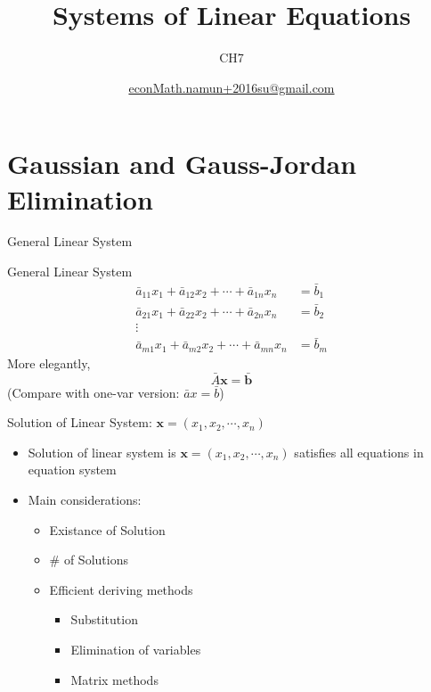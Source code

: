 \documentclass[final]{beamer}
\author[조남운]{\url{econMath.namun+2016su@gmail.com}}
\title{Systems of Linear Equations}
\subtitle{CH7}
\begin{document}
	
\maketitle


\section{Gaussian and Gauss-Jordan Elimination} %
\label{sec:gaussian_and_gauss_jordan_elimination}
\begin{frame}[t]{General Linear System}
	\begin{block}
		{General Linear System}
		\begin{align*}
			\bar a_{11} x_1 + \bar a_{12}x_2 + \cdots + \bar a_{1n}x_n &= \bar b_1\\
			\bar a_{21} x_1 + \bar a_{22}x_2 + \cdots + \bar a_{2n}x_n &= \bar b_2\\
			\vdots\\
			\bar a_{m1} x_1 + \bar a_{m2}x_2 + \cdots + \bar a_{mn}x_n &= \bar b_m
		\end{align*}
		More elegantly, 
		\[
			\bar{A}\mathbf{x} = \bar{\mathbf{b}}
		\]
		(Compare with one-var version: $\bar a x = \bar b$)
	\end{block}
\end{frame}
\begin{frame}[t]{Solution of Linear System: $\mathbf{x}=(x_1,x_2,\cdots,x_n)$}
	\begin{itemize}
		\item Solution of linear system is $\mathbf{x}=(x_1,x_2,\cdots,x_n)$ satisfies all equations in equation system
		\item Main considerations:
		\begin{itemize}
			\item Existance of Solution
			\item \# of Solutions
			\item Efficient deriving methods
			\begin{itemize}
				\item Substitution
				\item Elimination of variables
				\item Matrix methods
			\end{itemize}
		\end{itemize}
	\end{itemize}
\end{frame}
\end{document}
